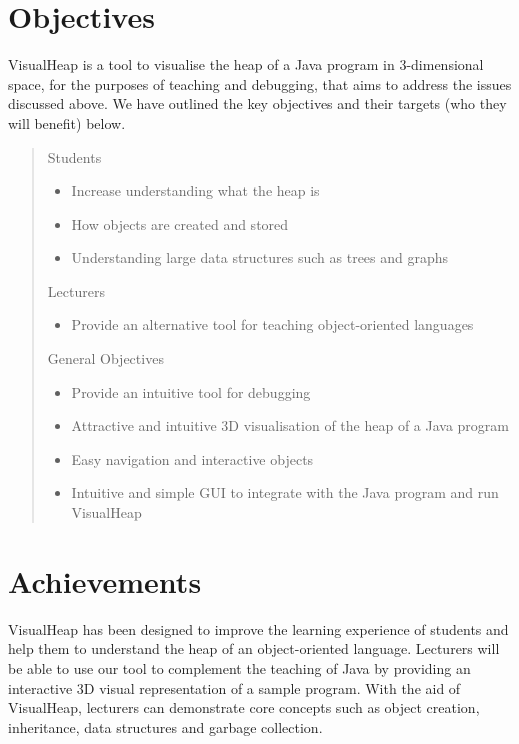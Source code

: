 \documentclass[11pt, a4paper]{report}
\begin{document}
\section{Objectives}

VisualHeap is a tool to visualise the heap of a Java program in 3-dimensional space, for the purposes of teaching and debugging, that aims to address the issues discussed above. We have  outlined the key objectives and their targets (who they will benefit) below.

\begin{quote}

Students

\begin{itemize}
  \item Increase understanding what the heap is 
  \item How objects are created and stored 
  \item Understanding large data structures such as trees and graphs
\end{itemize}

Lecturers

\begin{itemize}
  \item Provide an alternative tool for teaching object-oriented languages
\end{itemize}

General Objectives

\begin{itemize}
  \item Provide an intuitive tool for debugging
  \item Attractive and intuitive 3D visualisation of the heap of a Java program
  \item Easy navigation and interactive objects
  \item Intuitive and simple GUI to integrate with the Java program and run VisualHeap
\end{itemize}

\end{quote}

\section{Achievements}

VisualHeap has been designed to improve the learning experience of students and help them to understand the heap of an object-oriented language. Lecturers will be able to use our tool to complement the teaching of Java by providing an interactive 3D visual representation of a sample program. With the aid of VisualHeap, lecturers can demonstrate core concepts such as object creation, inheritance, data structures and garbage collection. 
\end{document}
